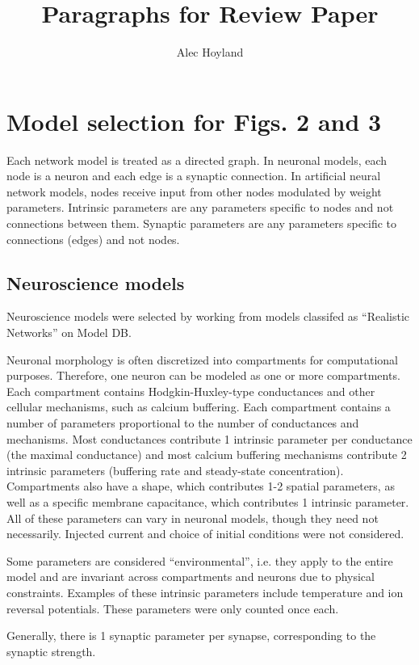 \documentclass[a4paper,10pt]{article} %
\title{Paragraphs for Review Paper}
\author{Alec Hoyland}
\begin{document}
\maketitle

\section{Model selection for Figs. 2 and 3}

Each network model is treated as a directed graph.
In neuronal models, each node is a neuron and each edge is a synaptic connection.
In artificial neural network models, nodes receive input from other nodes modulated by weight parameters.
Intrinsic parameters are any parameters specific to nodes and not connections between them.
Synaptic parameters are any parameters specific to connections (edges) and not nodes.

\subsection{Neuroscience models}

Neuroscience models were selected by working from models classifed as ``Realistic Networks'' on Model DB.

Neuronal morphology is often discretized into compartments for computational purposes.
Therefore, one neuron can be modeled as one or more compartments.
Each compartment contains Hodgkin-Huxley-type conductances and other cellular mechanisms,
such as calcium buffering.
Each compartment contains a number of parameters proportional to the number of conductances and mechanisms.
Most conductances contribute 1 intrinsic parameter per conductance (the maximal conductance)
and most calcium buffering mechanisms contribute 2 intrinsic parameters (buffering rate and steady-state concentration).
Compartments also have a shape, which contributes 1-2 spatial parameters,
as well as a specific membrane capacitance, which contributes 1 intrinsic parameter.
All of these parameters can vary in neuronal models, though they need not necessarily.
Injected current and choice of initial conditions were not considered.

Some parameters are considered ``environmental'', i.e. they apply to the entire model
and are invariant across compartments and neurons due to physical constraints.
Examples of these intrinsic parameters include temperature and ion reversal potentials.
These parameters were only counted once each.

Generally, there is 1 synaptic parameter per synapse, corresponding to the synaptic strength.
\end{document}
